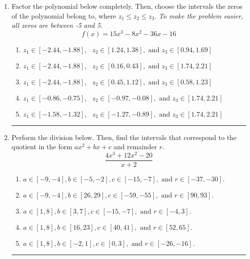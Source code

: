 \documentclass[14pt]{extbook}
\newcommand{\litem}[1]{\item#1\hspace*{-1cm}\rule{\textwidth}{0.4pt}}
\begin{document}
\begin{enumerate}
{\begin{enumerate}[label=\Alph*.]
\end{enumerate} }
\litem{
Factor the polynomial below completely. Then, choose the intervals the zeros of the polynomial belong to, where $z_1 \leq z_2 \leq z_3$. \textit{To make the problem easier, all zeros are between -5 and 5.}\[ f(x) = 15x^{3} -8 x^{2} -36 x -16 \]\begin{enumerate}[label=\Alph*.]
\item \( z_1 \in [-2.44, -1.88], \text{   }  z_2 \in [1.24, 1.38], \text{   and   } z_3 \in [0.94, 1.69] \)
\item \( z_1 \in [-2.44, -1.88], \text{   }  z_2 \in [0.16, 0.43], \text{   and   } z_3 \in [1.74, 2.21] \)
\item \( z_1 \in [-2.44, -1.88], \text{   }  z_2 \in [0.45, 1.12], \text{   and   } z_3 \in [0.58, 1.23] \)
\item \( z_1 \in [-0.86, -0.75], \text{   }  z_2 \in [-0.97, -0.08], \text{   and   } z_3 \in [1.74, 2.21] \)
\item \( z_1 \in [-1.58, -1.32], \text{   }  z_2 \in [-1.27, -0.89], \text{   and   } z_3 \in [1.74, 2.21] \)

\end{enumerate} }
\litem{
Perform the division below. Then, find the intervals that correspond to the quotient in the form $ax^2+bx+c$ and remainder $r$.\[ \frac{4x^{3} +12 x^{2} -20}{x + 2} \]\begin{enumerate}[label=\Alph*.]
\item \( a \in [-9, -4], b \in [-5, -2], c \in [-15, -7], \text{ and } r \in [-37, -30]. \)
\item \( a \in [-9, -4], b \in [26, 29], c \in [-59, -55], \text{ and } r \in [90, 93]. \)
\item \( a \in [1, 8], b \in [3, 7], c \in [-15, -7], \text{ and } r \in [-4, 3]. \)
\item \( a \in [1, 8], b \in [16, 23], c \in [40, 41], \text{ and } r \in [52, 65]. \)
\item \( a \in [1, 8], b \in [-2, 1], c \in [0, 3], \text{ and } r \in [-26, -16]. \)


\end{enumerate}}
\end{enumerate}
\end{document}
